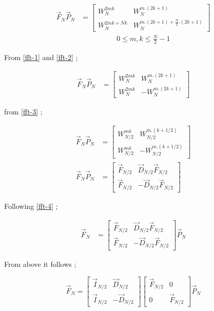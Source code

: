 \documentclass[journal,12pt,twocolumn]{IEEEtran}
\renewcommand\thesection{\arabic{section}}
\begin{document}
\begin{enumerate}[label=\arabic*.,ref=\thesection.\theenumi]
\begin{align}
	\vec{F}_{N}\vec{P}_{N}&=\begin{bmatrix}
		{W_{N}^{2mk}}&{W_{N}^{m.(2k+1)}}\\ {W_{N}^{2mk+Nk}}&{W_{N}^{m.(2k+1)+\frac{N}{2}.(2k+1)}}
	\end{bmatrix}  \nonumber \\
   &\quad \quad \quad \quad \quad 0 \le m,k \le \frac{N}{2}-1  \nonumber 	
\end{align}

From \eqref{fft-1} and \eqref{fft-2} ;

\begin{align}
	\vec{F}_{N}\vec{P}_{N}&=\begin{bmatrix}
		{W_{N}^{2mk}}&{W_{N}^{m.(2k+1)}}\\ {W_{N}^{2mk}}&-{W_{N}^{m.(2k+1)}}
	\end{bmatrix}  	
\end{align}
 
from \eqref{fft-3} ;

\begin{align}
	\vec{F}_{N}\vec{P}_{N}&=\begin{bmatrix}
		{W_{N/2}^{mk}}&{W_{N/2}^{m.(k+1/2)}}\\ {W_{N/2}^{mk}}&-{W_{N/2}^{m.(k+1/2)}}
	\end{bmatrix} 	\\
	\vec{F}_{N}\vec{P}_{N}&=\begin{bmatrix}
		\vec{F}_{N/2}&\vec{D}_{N/2}\vec{F}_{N/2}\\ \vec{F}_{N/2}&-\vec{D}_{N/2}\vec{F}_{N/2}
	\end{bmatrix}    	
\end{align}

Following \eqref{fft-4} ;

\begin{align}
	\vec{F}_{N}&=\begin{bmatrix}
		\vec{F}_{N/2}&\vec{D}_{N/2}\vec{F}_{N/2}\\ \vec{F}_{N/2}&-\vec{D}_{N/2}\vec{F}_{N/2}
	\end{bmatrix} \vec{P}_{N}   	
\end{align}

From above it follows ;

\begin{equation}
	\vec{F}_{N}=
	\begin{bmatrix}
		\vec{I}_{N/2} & \vec{D}_{N/2} \\
		\vec{I}_{N/2} & -\vec{D}_{N/2}
	\end{bmatrix}
	\begin{bmatrix}
		\vec{F}_{N/2} & 0 \\
		0 & \vec{F}_{N/2}
	\end{bmatrix}
	\vec{P}_{N}
\end{equation}


\end{enumerate}
\end{document}
